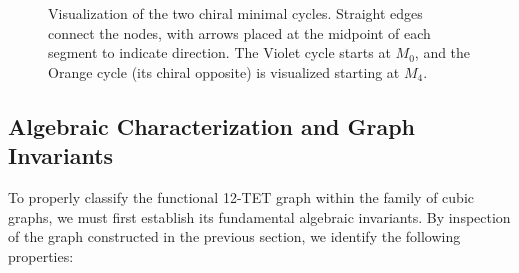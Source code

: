 \documentclass[12pt,letterpaper]{amsart}
\begin{document}
\begin{figure}[H]
    \caption{Visualization of the two chiral minimal cycles. Straight edges connect the nodes, with arrows placed at the midpoint of each segment to indicate direction. The Violet cycle starts at \texorpdfstring{$M_0$}{M0}, and the Orange cycle (its chiral opposite) is visualized starting at \texorpdfstring{$M_4$}{M4}.}
    \label{fig:chiral_cycles_straight_delta3}
\end{figure}
\subsection{Algebraic Characterization and Graph Invariants}
\label{sec:invariants_delta303}

To properly classify the functional 12-TET graph within the family of cubic graphs, we must first establish its fundamental algebraic invariants. By inspection of the graph constructed in the previous section, we identify the following properties:
\end{document}

